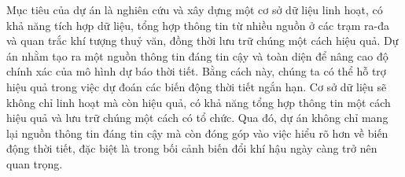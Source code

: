 
Mục tiêu của dự án là nghiên cứu và xây dựng một cơ sở dữ liệu linh hoạt, có khả năng tích hợp dữ liệu, tổng hợp thông tin từ nhiều nguồn ở các trạm ra-đa và quan trắc khí tượng thuỷ văn, đồng thời lưu trữ chúng một cách hiệu quả. Dự án nhằm tạo ra một nguồn thông tin đáng tin cậy và toàn diện để nâng cao độ chính xác của mô hình dự báo thời tiết. Bằng cách này, chúng ta có thể hỗ trợ hiệu quả trong việc dự đoán các biến động thời tiết ngắn hạn. Cơ sở dữ liệu sẽ không chỉ linh hoạt mà còn hiệu quả, có khả năng tổng hợp thông tin một cách hiệu quả và lưu trữ chúng một cách có tổ chức. Qua đó, dự án không chỉ mang lại nguồn thông tin đáng tin cậy mà còn đóng góp vào việc hiểu rõ hơn về biến động thời tiết, đặc biệt là trong bối cảnh biến đổi khí hậu ngày càng trở nên quan trọng.